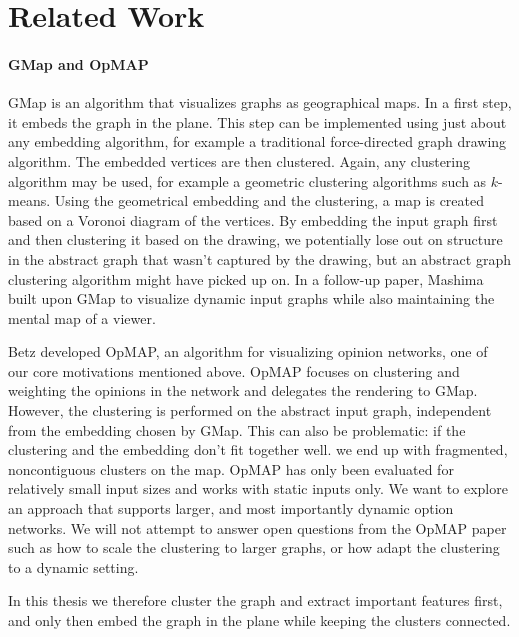 \section{Related Work}
\label{sect:related-work}


\paragraph{GMap and OpMAP}

GMap \cite{gansner2009gmap} is an algorithm that visualizes graphs as geographical maps. In a first step, it embeds the graph in the plane. This step can be implemented using just about any embedding algorithm, for example a traditional force-directed graph drawing algorithm. The embedded vertices are then clustered. Again, any clustering algorithm may be used, for example a geometric clustering algorithms such as $k$-means. Using the geometrical embedding and the clustering, a map is created based on a Voronoi diagram of the vertices. By embedding the input graph first and then clustering it based on the drawing, we potentially lose out on structure in the abstract graph that wasn't captured by the drawing, but an abstract graph clustering algorithm might have picked up on. In a follow-up paper, Mashima \etal{} \cite{mashima2011visualizing} built upon GMap to visualize dynamic input graphs while also maintaining the mental map of a viewer.

Betz \etal{} \cite{betz2019applying} developed OpMAP, an algorithm for visualizing opinion networks, one of our core motivations mentioned above. OpMAP focuses on clustering and weighting the opinions in the network and delegates the rendering to GMap. However, the clustering is performed on the abstract input graph, independent from the embedding chosen by GMap. This can also be problematic: if the clustering and the embedding don't fit together well. we end up with fragmented, noncontiguous clusters on the map. OpMAP has only been evaluated for relatively small input sizes and works with static inputs only. We want to explore an approach that supports larger, and most importantly dynamic option networks. We will not attempt to answer open questions from the OpMAP paper such as how to scale the clustering to larger graphs, or how adapt the clustering to a dynamic setting.

In this thesis we therefore cluster the graph and extract important features first, and only then embed the graph in the plane while keeping the clusters connected.


